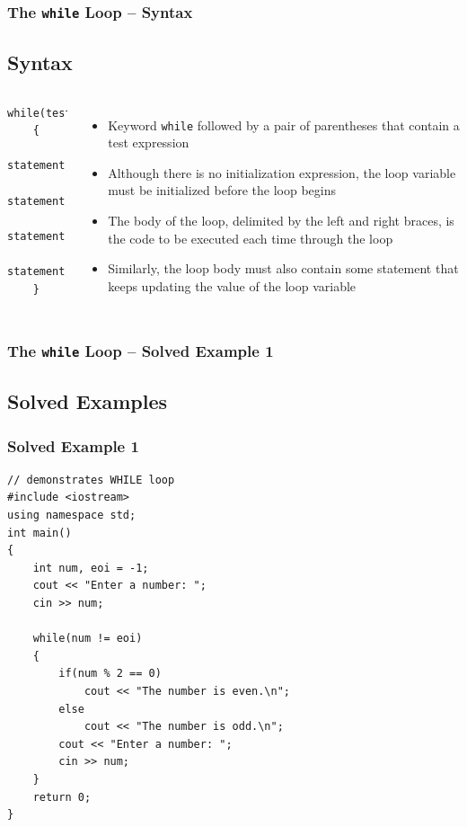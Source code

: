 \documentclass{beamer}
\begin{document}
\begin{frame}[fragile]
    \frametitle{The \texttt{while} Loop -- Syntax}
    \subsection{Syntax} %
    \label{sub:while_syntax}
    \begin{columns}
        \lstset{style=mystyle}
\begin{lstlisting}
while(test)
    {
       statement;
       statement;
       statement;
       statement;
    }
\end{lstlisting}
            \begin{itemize}
            \item Keyword \texttt{while} followed by a pair of parentheses that contain a test expression
            \item Although there is no initialization expression, the loop variable must be initialized before the loop begins
            \item The body of the loop, delimited by the left and right braces, is the code to be executed each time through the loop
            \item Similarly, the loop body must also contain some statement that keeps updating the value of the loop variable
            \end{itemize}
    \end{columns}
\end{frame}

\begin{frame} [fragile]
    \frametitle{The \texttt{while} Loop -- Solved Example 1}
    \subsection{Solved Examples} %
    \label{sub:while_solved_examples}
    \subsubsection{Solved Example 1} %
    \label{subsub:while_solved_example_1}
    \lstset{style=mystyle}
    \begin{lstlisting}
// demonstrates WHILE loop
#include <iostream>
using namespace std;
int main()
{
    int num, eoi = -1;
    cout << "Enter a number: ";
    cin >> num;

    while(num != eoi)
    {
        if(num % 2 == 0)
            cout << "The number is even.\n";
        else
            cout << "The number is odd.\n";
        cout << "Enter a number: ";
        cin >> num;
    }
    return 0;
}
\end{lstlisting}
\end{frame}
\end{document}
